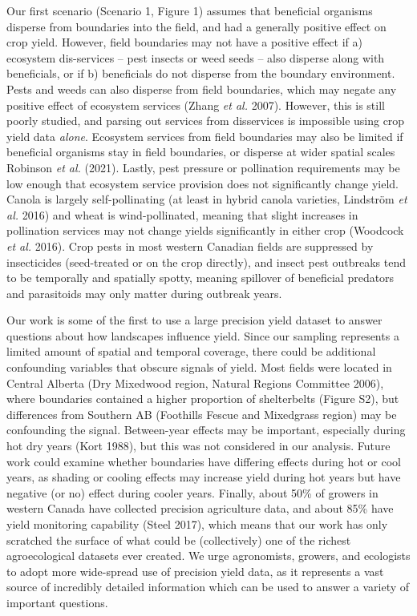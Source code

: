 \documentclass[]{elsarticle} %
\begin{document}
Our first scenario (Scenario 1, Figure 1) assumes that beneficial organisms disperse from boundaries into the field, and had a generally positive effect on crop yield.
However, field boundaries may not have a positive effect if a) ecosystem dis-services -- pest insects or weed seeds -- also disperse along with beneficials, or if b) beneficials do not disperse from the boundary environment.
Pests and weeds can also disperse from field boundaries, which may negate any positive effect of ecosystem services (Zhang \emph{et al.} 2007).
However, this is still poorly studied, and parsing out services from disservices is impossible using crop yield data \emph{alone}.
Ecosystem services from field boundaries may also be limited if beneficial organisms stay in field boundaries, or disperse at wider spatial scales Robinson \emph{et al.} (2021).
Lastly, pest pressure or pollination requirements may be low enough that ecosystem service provision does not significantly change yield.
Canola is largely self-pollinating (at least in hybrid canola varieties, Lindström \emph{et al.} 2016) and wheat is wind-pollinated, meaning that slight increases in pollination services may not change yields significantly in either crop (Woodcock \emph{et al.} 2016).
Crop pests in most western Canadian fields are suppressed by insecticides (seed-treated or on the crop directly), and insect pest outbreaks tend to be temporally and spatially spotty, meaning spillover of beneficial predators and parasitoids may only matter during outbreak years.

Our work is some of the first to use a large precision yield dataset to answer questions about how landscapes influence yield.
Since our sampling represents a limited amount of spatial and temporal coverage, there could be additional confounding variables that obscure signals of yield.
Most fields were located in Central Alberta (Dry Mixedwood region, Natural Regions Committee 2006), where boundaries contained a higher proportion of shelterbelts (Figure S2), but differences from Southern AB (Foothills Fescue and Mixedgrass region) may be confounding the signal.
Between-year effects may be important, especially during hot dry years (Kort 1988), but this was not considered in our analysis.
Future work could examine whether boundaries have differing effects during hot or cool years, as shading or cooling effects may increase yield during hot years but have negative (or no) effect during cooler years.
Finally, about 50\% of growers in western Canada have collected precision agriculture data, and about 85\% have yield monitoring capability (Steel 2017), which means that our work has only scratched the surface of what could be (collectively) one of the richest agroecological datasets ever created.
We urge agronomists, growers, and ecologists to adopt more wide-spread use of precision yield data, as it represents a vast source of incredibly detailed information which can be used to answer a variety of important questions.
\end{document}
